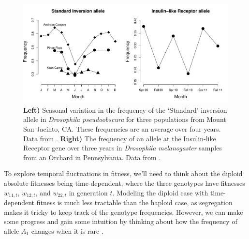 \begin{figure}
\begin{center}
\includegraphics[width=\textwidth]{Journal_figs/single_locus_selection/temporal_Droso_freq/temporal_Droso_freq.pdf}
\end{center}
\caption{{\bf Left)} Seasonal variation in the frequency of the `Standard' inversion allele in
  {\it Drosophila pseudoobscura} for three populations from Mount San
  Jacinto, CA. These frequencies are an average
  over four years. Data from \citet{wright:46}. {\bf Right)} The
  frequency of an allele at the Insulin-like Receptor gene over three
  years in {\it Drosophila melanogaster} samples from an Orchard in
  Pennsylvania. Data from \citet{paaby:14}. } \label{fig:Droso_fluct} 
\end{figure}

To explore temporal fluctuations in fitness, we'll need to
think about the diploid absolute fitnesses being time-dependent, where the three genotypes  have fitnesses
$w_{11,t}$, $w_{12,t}$, and $w_{22,t}$ in generation $t$. Modeling
the diploid case with time-dependent fitness is much less tractable than the haploid case, as segregation
makes it tricky to keep track of the genotype frequencies.  
However, we can make some progress and gain some intuition by thinking about
how the frequency of allele $A_1$ changes when it is rare
\citep[following the work of ][]{haldane1963}.\\



